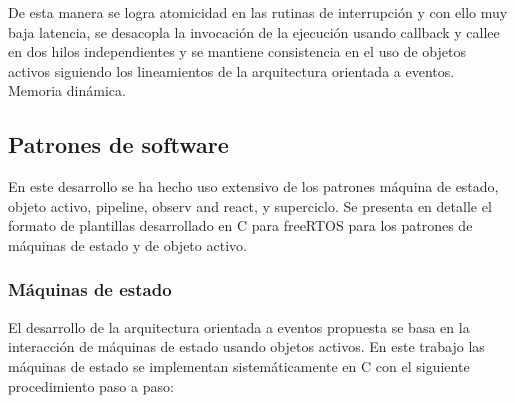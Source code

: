 De esta manera se logra atomicidad en las rutinas de interrupción y con ello muy baja latencia, se desacopla la invocación de la ejecución usando callback y callee en dos hilos independientes y se mantiene consistencia en el uso de objetos activos siguiendo los lineamientos de la arquitectura orientada a eventos.\\


Memoria dinámica.


\subsection{Patrones de software}
En este desarrollo se ha hecho uso extensivo de los patrones máquina de estado, objeto activo, pipeline, observ and react, y superciclo. Se presenta en detalle el formato de plantillas desarrollado en C para freeRTOS para los patrones de máquinas de estado y de objeto activo. \\

\subsubsection{Máquinas de estado}
El desarrollo de la arquitectura orientada a eventos propuesta se basa en la interacción de máquinas de estado usando objetos activos. En este trabajo las máquinas de estado se implementan sistemáticamente en C con el siguiente procedimiento paso a paso:

